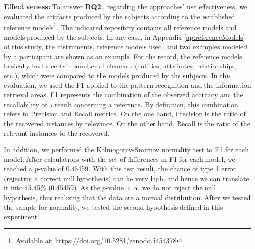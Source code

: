 \textbf{Effectiveness:} 
To answer \textbf{RQ2.}, regarding the approaches' use effectiveness, we evaluated the artifacts produced by the subjects according to the established reference models\footnote{Available at: \url{https://doi.org/10.5281/zenodo.5454378}}.
The indicated repository contains all reference models and models produced by the subjects.
In any case, in Appendix \ref{ap:referenceModels} of this study, the instruments, reference models used, and two examples modeled by a participant are shown as an example.
For the record, the reference models basically had a certain number of elements (entities, attributes, relationships, etc.), which were compared to the models produced by the subjects.
In this evaluation, we used the F1 applied to the pattern recognition and the information retrieval areas.
F1 represents the combination of the observed accuracy and the recallability of a result concerning a reference.
By definition, this combination refers to Precision and Recall metrics. 
On the one hand, Precision is the ratio of the recovered instances by relevance. 
On the other hand, Recall is the ratio of the relevant instances to the recovered.

In addition, we performed the Kolmogorov-Smirnov normality test to F1 for each model. 
After calculations with the set of differences in F1 for each model, we reached a $p$-value of 0.45459.
With this test result, the chance of type 1 error (rejecting a correct null hypothesis) can be very high, and hence we can translate it into 45.45\% (0.45459).
As the $p$-value > $\alpha$, we do not reject the null hypothesis, thus realizing that the data are a normal distribution.
After we tested the sample for normality, we tested the second hypothesis defined in this experiment.

